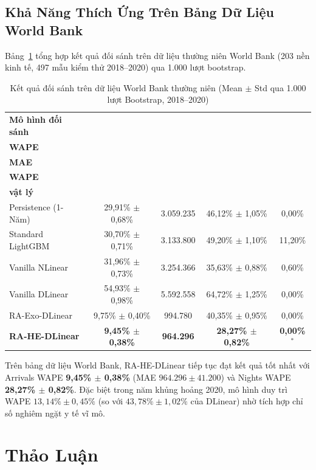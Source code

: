 \documentclass[10pt,journal,compsoc]{IEEEtran}
\begin{document}
\subsection{Khả Năng Thích Ứng Trên Bảng Dữ Liệu World Bank}
Bảng~\ref{tab:benchmark_wb} tổng hợp kết quả đối sánh trên dữ liệu thường niên World Bank (203 nền kinh tế, 497 mẫu kiểm thử 2018--2020) qua 1.000 lượt bootstrap.
\begin{table}[!htbp]
\centering
\caption{Kết quả đối sánh trên dữ liệu World Bank thường niên (Mean $\pm$ Std qua 1.000 lượt Bootstrap, 2018--2020)}
\label{tab:benchmark_wb}
\footnotesize
\setlength{\tabcolsep}{2.2pt}
\renewcommand{\arraystretch}{1.05}
\begin{tabular}{>{\raggedright\arraybackslash}p{2.25cm}cccc}
\toprule
\textbf{Mô hình đối sánh} & \shortstack{\textbf{Arr.} \\ \textbf{WAPE}} & \shortstack{\textbf{Arr.} \\ \textbf{MAE}} & \shortstack{\textbf{Nig.} \\ \textbf{WAPE}} & \shortstack{\textbf{Cận} \\ \textbf{vật lý}} \\
\midrule
Persistence (1-Năm) & 29,91\% $\pm$ 0,68\% & 3.059.235 & 46,12\% $\pm$ 1,05\% & 0,00\% \\
Standard LightGBM & 30,70\% $\pm$ 0,71\% & 3.133.800 & 49,20\% $\pm$ 1,10\% & 11,20\% \\
Vanilla NLinear & 31,96\% $\pm$ 0,73\% & 3.254.366 & 35,63\% $\pm$ 0,88\% & 0,60\% \\
Vanilla DLinear & 54,93\% $\pm$ 0,98\% & 5.592.558 & 64,72\% $\pm$ 1,25\% & 0,00\% \\
\midrule
RA-Exo-DLinear & 9,75\% $\pm$ 0,40\% & 994.780 & 40,35\% $\pm$ 0,95\% & 0,00\% \\
\textbf{RA-HE-DLinear} & \textbf{9,45\% $\pm$ 0,38\%} & \textbf{964.296} & \textbf{28,27\% $\pm$ 0,82\%} & \textbf{0,00\%}$^*$ \\
\bottomrule
\end{tabular}
\end{table}
Trên bảng dữ liệu World Bank, RA-HE-DLinear tiếp tục đạt kết quả tốt nhất với Arrivals WAPE \textbf{9,45\% $\pm$ 0,38\%} (MAE $964.296 \pm 41.200$) và Nights WAPE \textbf{28,27\% $\pm$ 0,82\%}. Đặc biệt trong năm khủng hoảng 2020, mô hình duy trì WAPE $13,14\% \pm 0,45\%$ (so với $43,78\% \pm 1,02\%$ của DLinear) nhờ tích hợp chỉ số nghiêm ngặt y tế vĩ mô.
\section{Thảo Luận}
\end{document}
